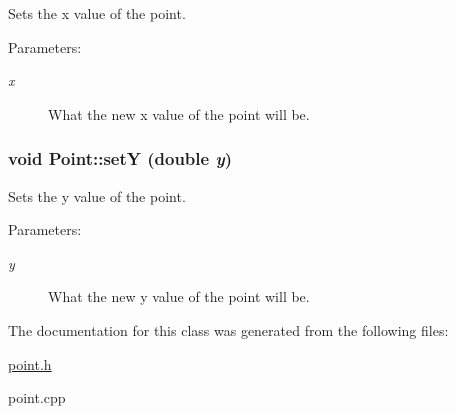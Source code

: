 Sets the x value of the point. 

\begin{Desc}
\item[Parameters:]
\begin{description}
\item[{\em x}]What the new x value of the point will be. \end{description}
\end{Desc}
\hypertarget{class_point_7d1ee63237f361d41e697f87c3cb051d}{
\subsubsection[{setY}]{\setlength{\rightskip}{0pt plus 5cm}void Point::setY (double {\em y})}}
\label{class_point_7d1ee63237f361d41e697f87c3cb051d}


Sets the y value of the point. 

\begin{Desc}
\item[Parameters:]
\begin{description}
\item[{\em y}]What the new y value of the point will be. \end{description}
\end{Desc}


The documentation for this class was generated from the following files:\begin{CompactItemize}
\item 
\hyperlink{point_8h}{point.h}\item 
point.cpp\end{CompactItemize}
